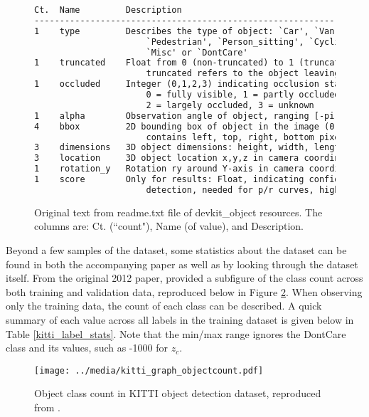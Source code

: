 \begin{figure}[ht] %
	\small
	\begin{lstlisting}[language=tex]
Ct.  Name         Description
----------------------------------------------------------------------------
1    type         Describes the type of object: `Car', `Van', `Truck',
                      `Pedestrian', `Person_sitting', `Cyclist', `Tram',
                      `Misc' or `DontCare'
1    truncated    Float from 0 (non-truncated) to 1 (truncated), where
                      truncated refers to the object leaving image boundaries
1    occluded     Integer (0,1,2,3) indicating occlusion state:
                      0 = fully visible, 1 = partly occluded
                      2 = largely occluded, 3 = unknown
1    alpha        Observation angle of object, ranging [-pi..pi]
4    bbox         2D bounding box of object in the image (0-based index):
                      contains left, top, right, bottom pixel coordinates
3    dimensions   3D object dimensions: height, width, length (in meters)
3    location     3D object location x,y,z in camera coordinates (in meters)
1    rotation_y   Rotation ry around Y-axis in camera coordinates [-pi..pi]
1    score        Only for results: Float, indicating confidence in
                      detection, needed for p/r curves, higher is better.
	\end{lstlisting}
	\onehalfspacing %
	\caption{Original text from readme.txt file of devkit\_object resources. The columns are: Ct. (``count"), Name (of value), and Description.}
	\label{kitti_devkit_info} %
\end{figure}

Beyond a few samples of the dataset, some statistics about the dataset can be found in both the accompanying paper as well as by looking through the dataset itself. From the original 2012 paper, \cite{geiger_are_2012} provided a subfigure of the class count across both training and validation data, reproduced below in Figure \ref{kitti_graph_objectcount}. When observing only the training data, the count of each class can be described. A quick summary of each value across all labels in the training dataset is given below in Table \ref{kitti_label_stats}. Note that the min/max range ignores the DontCare class and its values, such as -1000 for $z_c$.

\begin{figure}[H]
	\centering
	\texttt{[image: ../media/kitti\_graph\_objectcount.pdf]}
	\caption{Object class count in KITTI object detection dataset, reproduced from \cite{geiger_are_2012}.}
	\label{kitti_graph_objectcount}
\end{figure}

